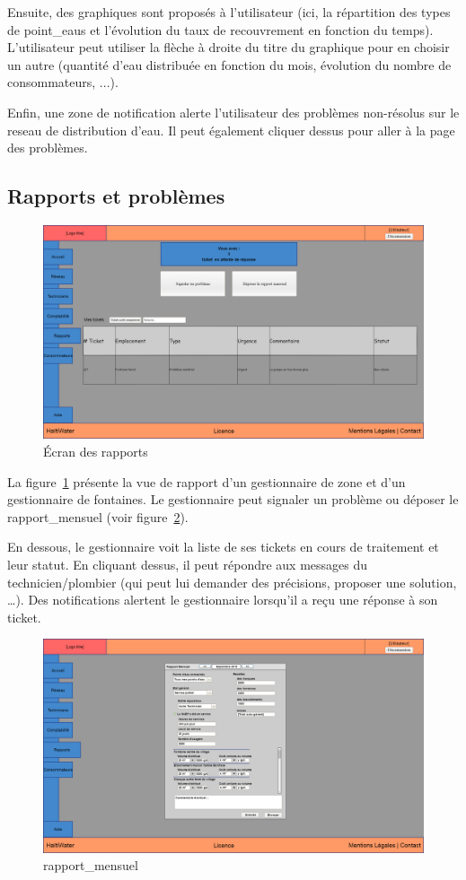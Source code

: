 \documentclass[a4paper, 11pt]{article}
\begin{document}
    Ensuite, des graphiques sont proposés à l'\gls{utilisateur} (ici, la répartition des types de \glspl{point_eau} et l'évolution du taux de recouvrement en fonction du temps). L'\gls{utilisateur} peut utiliser la flèche à droite du titre du graphique pour en choisir un autre (quantité d'eau distribuée en fonction du mois, évolution du nombre de \glspl{consommateur}, ...).

    Enfin, une \gls{zone} de notification alerte l'\gls{utilisateur} des problèmes non-résolus sur le \gls{reseau} de distribution d'eau. Il peut également cliquer dessus pour aller à la page des problèmes.

  \subsection{Rapports et problèmes}
    \begin{figure}[H]
        \centering
        \includegraphics[width=.8\textwidth]{Cahier_des_Charges/rapports}
        \caption{\'Ecran des rapports}
        \label{fig:report}
    \end{figure}
    La figure~\ref{fig:report} présente la vue de rapport d'un gestionnaire de \gls{zone} et d'un gestionnaire de \glspl{fontaine}. Le gestionnaire peut signaler un problème ou déposer le \gls{rapport_mensuel} (voir figure~\ref{fig:monthly_report}).

    En dessous, le gestionnaire voit la liste de ses \glspl{ticket} en cours de traitement et leur statut. En cliquant dessus, il peut répondre aux messages du technicien/plombier (qui peut lui demander des précisions, proposer une solution, \dots). Des notifications alertent le gestionnaire lorsqu'il a reçu une réponse à son \gls{ticket}.

    \begin{figure}[H]
        \centering
        \includegraphics[width=.8\textwidth]{Cahier_des_Charges/rapports_mensuel}
        \caption{\gls{rapport_mensuel}}
        \label{fig:monthly_report}
    \end{figure}
\end{document}
